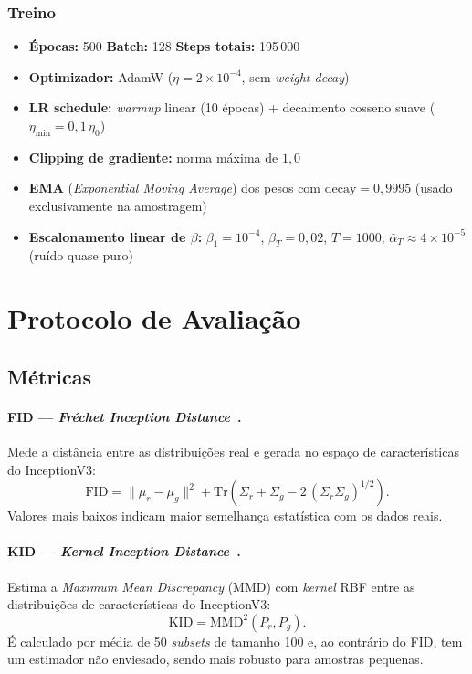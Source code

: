 \documentclass[12pt,a4paper]{article}
\begin{document}
\subsubsection*{Treino}

\begin{itemize}
  \item \textbf{Épocas:} 500 \quad \textbf{Batch:} 128 \quad \textbf{Steps totais:} 195\,000
  \item \textbf{Optimizador:} AdamW ($\eta = 2 \times 10^{-4}$, sem \textit{weight decay})
  \item \textbf{LR schedule:} \textit{warmup} linear (10 épocas) + decaimento cosseno
        suave ($\eta_{\min} = 0{,}1\,\eta_0$)
  \item \textbf{Clipping de gradiente:} norma máxima de $1{,}0$
  \item \textbf{EMA} (\textit{Exponential Moving Average}) dos pesos com
        $\text{decay} = 0{,}9995$ (usado exclusivamente na amostragem)
  \item \textbf{Escalonamento linear de $\beta$:}
        $\beta_1 = 10^{-4}$, $\beta_T = 0{,}02$, $T = 1000$;
        $\bar\alpha_T \approx 4 \times 10^{-5}$ (ruído quase puro)
\end{itemize}

\section{Protocolo de Avaliação}

\subsection*{Métricas}

\paragraph{FID — \textit{Fréchet Inception Distance}~\cite{heusel2017fid}.}
Mede a distância entre as distribuições real e gerada no espaço de
características do InceptionV3:
\begin{equation}
  \mathrm{FID} = \|\mu_r - \mu_g\|^2
    + \mathrm{Tr}\!\left(\Sigma_r + \Sigma_g - 2\,(\Sigma_r\Sigma_g)^{1/2}\right).
\end{equation}
Valores mais baixos indicam maior semelhança estatística com os dados reais.

\paragraph{KID — \textit{Kernel Inception Distance}~\cite{binkowski2018kid}.}
Estima a \textit{Maximum Mean Discrepancy} (MMD) com \textit{kernel} RBF
entre as distribuições de características do InceptionV3:
\begin{equation}
  \mathrm{KID} = \mathrm{MMD}^2(P_r, P_g).
\end{equation}
É calculado por média de 50 \textit{subsets} de tamanho 100 e, ao contrário do
FID, tem um estimador não enviesado, sendo mais robusto para amostras pequenas.
\end{document}
